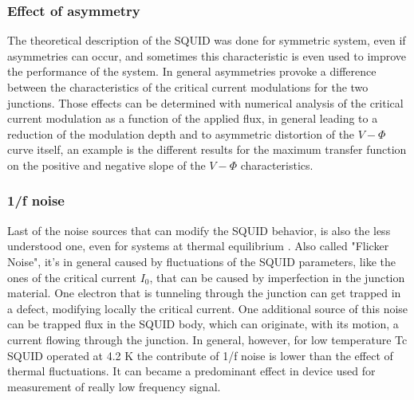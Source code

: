 \documentclass[12pt,a4paper]{report}
\begin{document}
    \subsubsection{Effect of asymmetry}
    The theoretical description of the SQUID was done for symmetric system, even if asymmetries can occur, and sometimes this characteristic is even used to improve the performance of the system. In general asymmetries provoke a difference between the characteristics of the critical current modulations for the two junctions. Those effects can be determined with numerical analysis \cite{Squid_handbook_1} of the critical current modulation as a function of the applied flux, in general leading to a reduction of the modulation depth and to asymmetric distortion of the $V-\Phi$ curve itself, an example is the different results for the maximum transfer function on the positive and negative slope of the $V-\Phi$ characteristics.
    \subsubsection{1/f noise}
    Last of the noise sources that can modify the SQUID behavior, is also the less understood one, even for systems at thermal equilibrium \cite{1/f_noise} . Also called "Flicker Noise", it's in general caused by fluctuations of the SQUID parameters, like the ones of the critical current $I_0$, that can be caused by imperfection in the junction material. One electron that is tunneling through the junction can get trapped in a defect, modifying locally the critical current. One additional source of this noise can be trapped flux in the SQUID body, which can originate, with its motion, a current flowing through the junction.
    In general, however, for low temperature Tc SQUID operated at 4.2 K the contribute of 1/f noise is lower than the effect of thermal fluctuations. It can became a predominant effect in device used for measurement of really low frequency signal.
\end{document}
